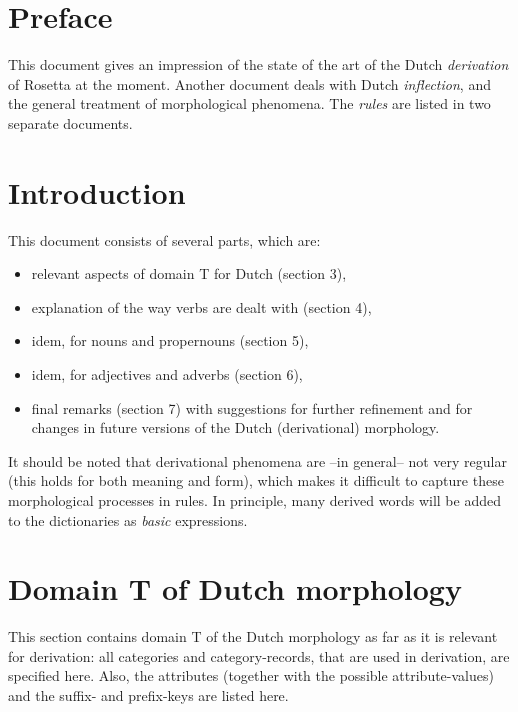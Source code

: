 
   \RosDate{\today}
   \RosSupersedes{-}
   \MakeRosTitle


\section{Preface}

This document gives an impression
of the state of the art of the Dutch {\em derivation} of Rosetta at the moment. 
Another document deals with Dutch {\em inflection}, and the general treatment 
of morphological phenomena.
The {\em rules} are listed in two separate documents.

\newpage
\section{Introduction}

This document consists of several parts, which are:
\begin{itemize}
  \item relevant aspects of domain T for Dutch (section 3),
  \item explanation of the way verbs are dealt with (section 4),
  \item idem, for nouns and propernouns (section 5),
  \item idem, for adjectives and adverbs (section 6),
  \item final remarks (section 7) with suggestions for further refinement and
        for changes in future versions of the Dutch (derivational) morphology.
\end{itemize} 

It should be noted that derivational phenomena are --in general-- not very
regular (this holds for both meaning and form), which makes it difficult to
capture these morphological processes in rules. In principle, many derived words
will be added to the dictionaries as {\em basic} expressions.

\newpage
\section{Domain T of Dutch morphology}

This section contains domain T of the Dutch morphology as far as it is
relevant for derivation: all categories and category-records, that are used
in derivation, are specified here. Also, the attributes (together with the 
possible attribute-values) and the suffix- and prefix-keys are listed here.

